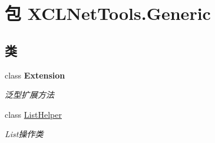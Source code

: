\hypertarget{namespace_x_c_l_net_tools_1_1_generic}{\section{包 X\-C\-L\-Net\-Tools.\-Generic}
\label{namespace_x_c_l_net_tools_1_1_generic}
}
\subsection*{类}
\begin{DoxyCompactItemize}
\item 
class {\bfseries Extension}
\begin{DoxyCompactList}\small\item\em 泛型扩展方法 \end{DoxyCompactList}\item 
class \hyperlink{class_x_c_l_net_tools_1_1_generic_1_1_list_helper}{List\-Helper}
\begin{DoxyCompactList}\small\item\em List操作类 \end{DoxyCompactList}\end{DoxyCompactItemize}
